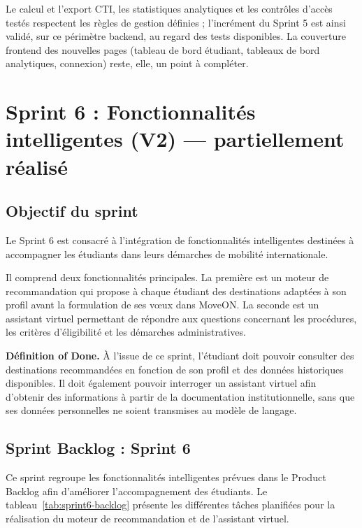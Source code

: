 Le calcul et l'export CTI, les statistiques analytiques et les contrôles d'accès testés respectent les règles de gestion définies ; l'incrément du Sprint 5 est ainsi validé, sur ce périmètre backend, au regard des tests disponibles. La couverture frontend des nouvelles pages (tableau de bord étudiant, tableaux de bord analytiques, connexion) reste, elle, un point à compléter.

\section{Sprint 6 : Fonctionnalités intelligentes (V2) --- partiellement réalisé}

\subsection{Objectif du sprint}

Le Sprint 6 est consacré à l'intégration de fonctionnalités intelligentes
destinées à accompagner les étudiants dans leurs démarches de mobilité
internationale.

Il comprend deux fonctionnalités principales. La première est un moteur de
recommandation qui propose à chaque étudiant des destinations adaptées à son
profil avant la formulation de ses vœux dans MoveON. La seconde est un
assistant virtuel permettant de répondre aux questions concernant les
procédures, les critères d'éligibilité et les démarches administratives.

\textbf{Définition of Done.} À l'issue de ce sprint, l'étudiant doit pouvoir
consulter des destinations recommandées en fonction de son profil et des données
historiques disponibles. Il doit également pouvoir interroger un assistant virtuel
afin d'obtenir des informations à partir de la documentation institutionnelle,
sans que ses données personnelles ne soient transmises au modèle de langage.

\setcounter{tasknum}{1}

\subsection{Sprint Backlog : Sprint 6}

Ce sprint regroupe les fonctionnalités intelligentes prévues dans le Product
Backlog afin d'améliorer l'accompagnement des étudiants. Le
tableau~\ref{tab:sprint6-backlog} présente les différentes tâches planifiées
pour la réalisation du moteur de recommandation et de l'assistant virtuel.

